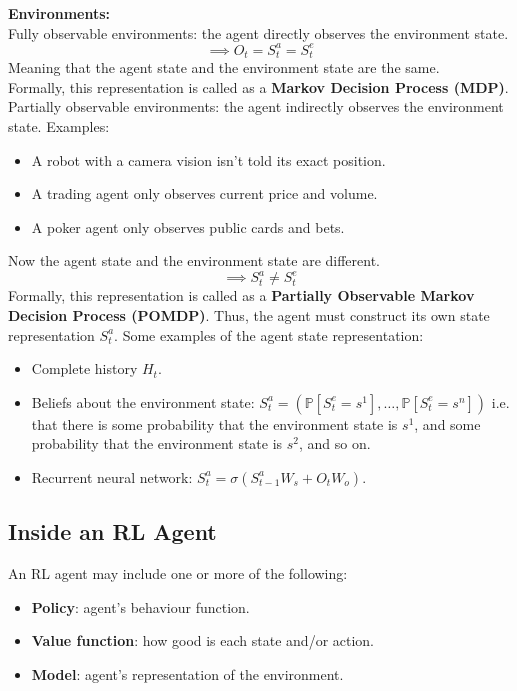 \textbf{Environments:}\\
Fully observable environments: the agent directly observes the environment state.
\[
    \implies O_t = S_t^a = S_t^e
\]
Meaning that the agent state and the environment state are the same.\\
Formally, this representation is called as a \textbf{Markov Decision Process (MDP)}.\\
Partially observable environments: the agent indirectly observes the environment state.
Examples:
\begin{itemize}
    \item A robot with a camera vision isn't told its exact position.
    \item A trading agent only observes current price and volume.
    \item A poker agent only observes public cards and bets.
\end{itemize}
Now the agent state and the environment state are different.
\[
    \implies S_t^a \neq S_t^e  
\]
Formally, this representation is called as a \textbf{Partially Observable Markov 
Decision Process (POMDP)}. Thus, the agent must construct its own state representation \(S_t^a\).
Some examples of the agent state representation:
\begin{itemize}
    \item Complete history \(H_t\).
    \item Beliefs about the environment state: \(S_t^a = (\mathbb{P}[S_t^e = s^1], 
    \dots, \mathbb{P}[S_t^e = s^n])\) i.e. that there is some probability that the environment
    state is \(s^1\), and some probability that the environment state is \(s^2\), and so on.
    \item Recurrent neural network: \(S_t^a = \sigma (S_{t-1}^a W_s + O_t W_o)\).
\end{itemize}

\subsection{Inside an RL Agent}
An RL agent may include one or more of the following:
\begin{itemize}
    \item \textbf{Policy}: agent's behaviour function.
    \item \textbf{Value function}: how good is each state and/or action.
    \item \textbf{Model}: agent's representation of the environment.
\end{itemize}

